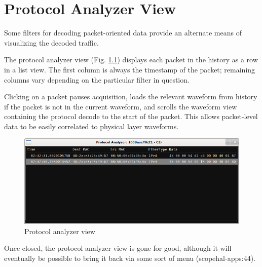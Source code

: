 \chapter{Protocol Analyzer View}

Some filters for decoding packet-oriented data provide an alternate means of visualizing the decoded traffic.

The protocol analyzer view (Fig. \ref{proto-analyzer}) displays each packet in the history as a row in a list view. The
first column is always the timestamp of the packet; remaining columns vary depending on the particular filter in
question.

Clicking on a packet pauses acquisition, loads the relevant waveform from history if the packet is not in the current
waveform, and scrolls the waveform view containing the protocol decode to the start of the packet. This allows
packet-level data to be easily correlated to physical layer waveforms.

\begin{figure}[H]
\centering
\includegraphics[width=14cm]{images/proto-analyzer.png}
\caption{Protocol analyzer view}
\label{proto-analyzer}
\end{figure}

Once closed, the protocol analyzer view is gone for good, although it will eventually be possible to bring it back via
some sort of menu (scopehal-apps:44).

